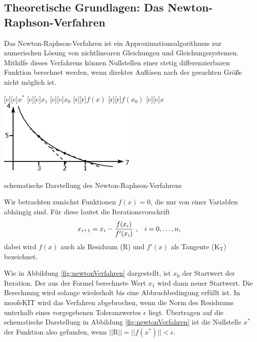 \documentclass[12pt,bibstyle=none,pagenumberinfooter]{ifmdocument}
\begin{document}
\subsection{Theoretische Grundlagen: Das Newton-Raphson-Verfahren}
Das Newton-Raphson-Verfahren ist ein Approximationsalgorithmus zur numerischen Lösung von nichtlinearen Gleichungen und Gleichungssystemen. Mithilfe dieses Verfahrens k\"onnen Nullstellen einer stetig differenzierbaren Funktion berechnet werden, wenn direktes Aufl\"osen nach der gesuchten Gr\"oße nicht m\"oglich ist.
 \begin{myfigure}
	{
		{\footnotesize $x^*$}
		{\footnotesize$x_1$}
		{\footnotesize$x_0$}
		{\footnotesize $f(x)$}
		{\footnotesize$f(x_0)$}
		{\footnotesize $x$}
		\includegraphics[width=0.5\textwidth]{newtonVerfahren}
	}
	\caption{schematische Darstellung des Newton-Raphson-Verfahrens}
	\label{fig:newtonVerfahren}
\end{myfigure}

Wir betrachten zunächst Funktionen $f(x)=0$, die nur von einer Variablen abhängig sind. Für diese lautet die Iterationsvorschrift
\begin{equation}
x_{i+1}=x_i-\frac{f(x_i)}{f'(x_i)}~\text{,}\quad i=0,\dots,n \text{,} \label{eq:NewtonOneVariableIterationScheme}
\end{equation}
dabei wird $f(x) \label{eq:Residuum}$ auch als Residuum ($\mathrm{R}$) und $f'(x) \label{eq:Tangente}$ als Tangente ($\mathrm{K}_{\mathrm{T}}$) bezeichnet. 


 Wie in Abbildung \ref{fig:newtonVerfahren} dargestellt, ist $x_0$ der Startwert der Iteration. Der aus der Formel berechnete Wert $x_1$ wird dann neuer Startwert. Die Berechnung wird solange wiederholt bis eine Abbruchbedingung erf\"ullt ist. In moofeKIT wird das Verfahren abgebrochen, wenn die Norm des Residuums unterhalb eines vorgegebenen Toleranzwertes $\epsilon$ liegt. Übertragen auf die schematische Darstellung in Abbildung \ref{fig:newtonVerfahren} ist die Nullstelle $x^*$ der Funktion also gefunden, wenn $||\mathrm{R}|| = ||f(x^*)|| < \epsilon$.
\end{document}
